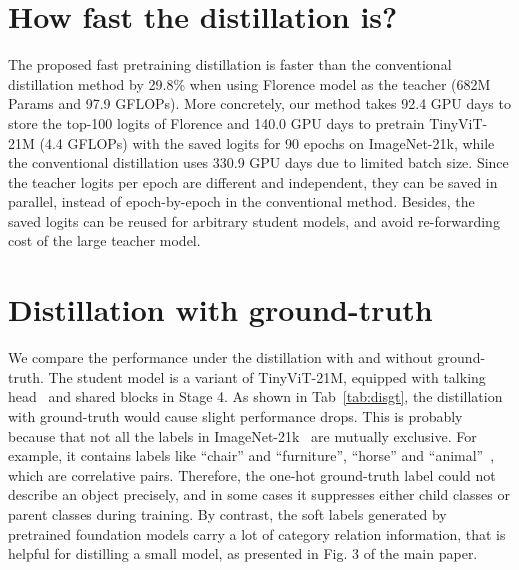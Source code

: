 \documentclass[runningheads]{llncs}
\begin{document}
\section{How fast the distillation is?}
\vspace{-1mm}
The proposed fast pretraining distillation is faster than the conventional distillation method by 29.8\% when using Florence model as the teacher (682M Params and 97.9 GFLOPs). More concretely, our method takes 92.4 GPU days to store the top-100 logits of Florence and 140.0 GPU days to pretrain TinyViT-21M (4.4 GFLOPs) with the saved logits for 90 epochs on ImageNet-21k, while the conventional distillation uses 330.9 GPU days due to limited batch size. Since the teacher logits per epoch are different and independent, they can be saved in parallel, instead of epoch-by-epoch in the conventional method. Besides, the saved logits can be reused for arbitrary student models, and avoid re-forwarding cost of the large teacher model.

\vspace{-2mm}
\section{Distillation with ground-truth}
\vspace{-1mm}
We compare the performance under the distillation with and without ground-truth. The student model is a variant of TinyViT-21M, equipped with talking head~\cite{talking_head} and shared blocks in Stage 4. As shown in Tab~\ref{tab:disgt}, the distillation with ground-truth would cause slight performance drops. This is probably because that not all the labels in ImageNet-21k~\cite{imagenet} are mutually exclusive. For example, it contains labels like ``chair'' and ``furniture'', ``horse'' and ``animal''~\cite{ridnik2021imagenet}, which are correlative pairs. Therefore, the one-hot ground-truth label could not describe an object precisely, and in some cases it suppresses either child classes or parent classes during training. By contrast, the soft labels generated by pretrained foundation models carry a lot of category relation information, that is helpful for distilling a small model, as presented in Fig. 3 of the main paper.
\end{document}
